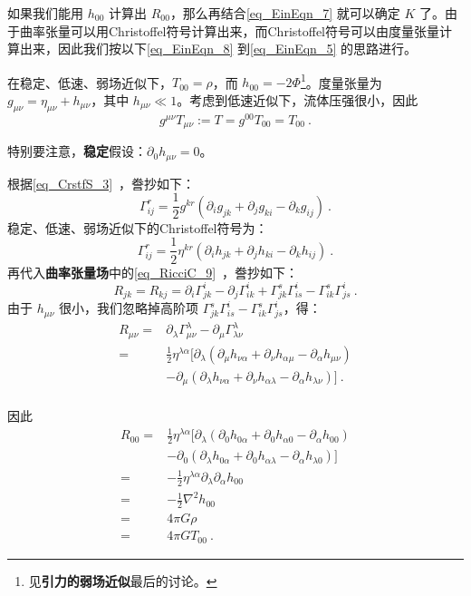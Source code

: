 如果我们能用 $h_{00}$ 计算出 $R_{00}$，那么再结合\autoref{eq_EinEqn_7} 就可以确定 $K$ 了。由于曲率张量可以用Christoffel符号计算出来，而Christoffel符号可以由度量张量计算出来，因此我们按以下\autoref{eq_EinEqn_8} 到\autoref{eq_EinEqn_5} 的思路进行。

在稳定、低速、弱场近似下，$T_{00}=\rho$，而 $h_{00}=-2\Phi$\footnote{见\textbf{引力的弱场近似}最后的讨论。}。度量张量为 $g_{\mu\nu}=\eta_{\mu\nu}+h_{\mu\nu}$，其中 $h_{\mu\nu}\ll 1$。考虑到低速近似下，流体压强很小，因此 
\begin{equation}\label{eq_EinEqn_10}
g^{\mu\nu}T_{\mu\nu}:=T=g^{00}T_{00}=T_{00}~.
\end{equation}

特别要注意，\textbf{稳定}假设：$\partial_0h_{\mu\nu}=0$。


根据\autoref{eq_CrstfS_3}~，誊抄如下：
\begin{equation}\label{eq_EinEqn_8}
\Gamma^{r}_{ij}=\frac{1}{2}g^{kr}(\partial_ig_{jk}+\partial_jg_{ki}-\partial_kg_{ij})~.
\end{equation}
稳定、低速、弱场近似下的Christoffel符号为：
\begin{equation}
\Gamma^{r}_{ij}=\frac{1}{2}\eta^{kr}(\partial_ih_{jk}+\partial_jh_{ki}-\partial_kh_{ij})~.
\end{equation}
再代入\textbf{曲率张量场}中的\autoref{eq_RicciC_9}~，誊抄如下：
\begin{equation}
R_{jk}=R_{kj}=\partial_i\Gamma^i_{jk}-\partial_j\Gamma^{i}_{ik}+\Gamma^s_{jk}\Gamma^i_{is}-\Gamma^s_{ik}\Gamma^i_{js}~.
\end{equation}
由于 $h_{\mu\nu}$ 很小，我们忽略掉高阶项 $\Gamma^s_{jk}\Gamma^i_{is}-\Gamma^s_{ik}\Gamma^i_{js}$，得：
\begin{equation}
\begin{aligned}
R_{\mu\nu}=&\partial_\lambda\Gamma^\lambda_{\mu\nu}-\partial_{\mu}\Gamma^\lambda_{\lambda\nu}\\
=&\frac{1}{2}\eta^{\lambda\alpha}[\partial_\lambda(\partial_\mu h_{\nu \alpha}+\partial_\nu h_{\alpha\mu}-\partial_\alpha h_{\mu\nu})\\
&-\partial_\mu(\partial_\lambda h_{\nu\alpha}+\partial_\nu h_{\alpha\lambda}-\partial_\alpha h_{\lambda\nu})]~.\\
\end{aligned}
\end{equation}

因此
\begin{equation}\label{eq_EinEqn_5}
\begin{aligned}
R_{00}=&\frac{1}{2}\eta^{\lambda\alpha}[\partial_\lambda(\partial_0 h_{0 \alpha}+\partial_0 h_{\alpha0}-\partial_\alpha h_{00})\\
&-\partial_0(\partial_\lambda h_{0\alpha}+\partial_0 h_{\alpha\lambda}-\partial_\alpha h_{\lambda0})]\\
=&-\frac{1}{2}\eta^{\lambda\alpha}\partial_\lambda\partial_\alpha h_{00}\\
=&-\frac{1}{2}\nabla^2 h_{00}\\
=&4\pi G\rho\\
=&4\pi GT_{00}~.
\end{aligned}
\end{equation}


